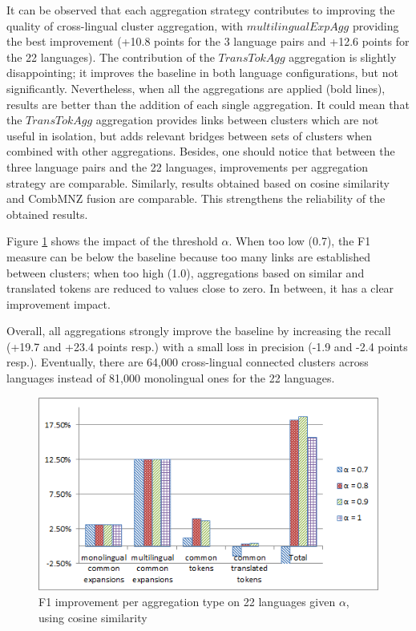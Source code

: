 \documentclass[output=paper]{langsci/langscibook}
\begin{document}
It can be observed that each aggregation strategy contributes to
improving the quality of cross-lingual cluster aggregation, with
$multilingual ExpAgg$ providing the best improvement (+10.8 points for
the 3 language pairs and +12.6 points for the 22 languages). The
contribution of the $TransTokAgg$ aggregation is slightly
disappointing; it improves the baseline in both language
configurations, but not significantly.  Nevertheless, when all the
aggregations are applied (bold lines), results are better than the
addition of each single aggregation. It could mean that the
$TransTokAgg$ aggregation provides links between clusters which are
not useful in isolation, but adds relevant bridges between sets of
clusters when combined with other aggregations. Besides, one should
notice that between the three language pairs and the 22 languages,
improvements per aggregation strategy are comparable. Similarly,
results obtained based on cosine similarity and CombMNZ fusion are
comparable.  This strengthens the reliability of the obtained results.

Figure \ref{fig:Eval22l} shows the impact of the threshold
$\alpha$. When too low (0.7), the F1 measure can be below the baseline
because too many links are established between clusters; when too high
(1.0), aggregations based on similar and translated tokens are reduced
to values close to zero.  In between, it has a clear improvement
impact.

Overall, all aggregations strongly improve the baseline by increasing
the recall (+19.7 and +23.4 points resp.) with a small loss in
precision (-1.9 and -2.4 points resp.). Eventually, there are 64,000
cross-lingual connected clusters across languages instead of 81,000
monolingual ones for the 22 languages.

\begin{figure}
\includegraphics[scale=0.7]{figures/cosine_average_all_ln_improvment.png}
\caption{F1 improvement per aggregation type on 22 languages given $\alpha$, using cosine similarity}
\label{fig:Eval22l}
\end{figure}
\end{document}
